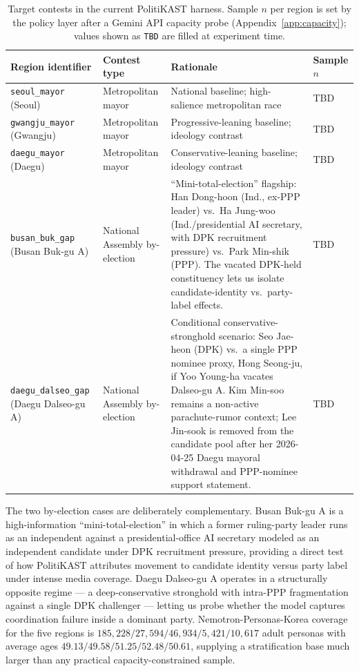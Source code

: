 \documentclass[11pt]{article}
\begin{document}
\begin{table}[h]
\centering
\caption{Target contests in the current PolitiKAST harness. Sample $n$ per region is set by the policy layer after a Gemini API capacity probe (Appendix~\ref{app:capacity}); values shown as \texttt{TBD} are filled at experiment time.}
\label{tab:target-contests}
\begin{tabularx}{\textwidth}{L{0.20\textwidth}L{0.20\textwidth}YL{0.08\textwidth}}
\toprule
Region identifier & Contest type & Rationale & Sample $n$ \\
\midrule
\texttt{seoul\_mayor} (Seoul) & Metropolitan mayor & National baseline; high-salience metropolitan race & TBD \\
\texttt{gwangju\_mayor} (Gwangju) & Metropolitan mayor & Progressive-leaning baseline; ideology contrast & TBD \\
\texttt{daegu\_mayor} (Daegu) & Metropolitan mayor & Conservative-leaning baseline; ideology contrast & TBD \\
\texttt{busan\_buk\_gap} (Busan Buk-gu A) & National Assembly by-election & ``Mini-total-election'' flagship: Han Dong-hoon (Ind., ex-PPP leader) vs.\ Ha Jung-woo (Ind./presidential AI secretary, with DPK recruitment pressure) vs.\ Park Min-shik (PPP). The vacated DPK-held constituency lets us isolate candidate-identity vs.\ party-label effects. & TBD \\
\texttt{daegu\_dalseo\_gap} (Daegu Dalseo-gu A) & National Assembly by-election & Conditional conservative-stronghold scenario: Seo Jae-heon (DPK) vs.\ a single PPP nominee proxy, Hong Seong-ju, if Yoo Young-ha vacates Dalseo-gu A. Kim Min-soo remains a non-active parachute-rumor context; Lee Jin-sook is removed from the candidate pool after her 2026-04-25 Daegu mayoral withdrawal and PPP-nominee support statement. & TBD \\
\bottomrule
\end{tabularx}
\end{table}

The two by-election cases are deliberately complementary. Busan Buk-gu A is a high-information ``mini-total-election'' in which a former ruling-party leader runs as an independent against a presidential-office AI secretary modeled as an independent candidate under DPK recruitment pressure, providing a direct test of how PolitiKAST attributes movement to candidate identity versus party label under intense media coverage. Daegu Dalseo-gu A operates in a structurally opposite regime --- a deep-conservative stronghold with intra-PPP fragmentation against a single DPK challenger --- letting us probe whether the model captures coordination failure inside a dominant party. Nemotron-Personas-Korea coverage for the five regions is $185{,}228 / 27{,}594 / 46{,}934 / 5{,}421 / 10{,}617$ adult personas with average ages $49.13 / 49.58 / 51.25 / 52.48 / 50.61$, supplying a stratification base much larger than any practical capacity-constrained sample.
\end{document}
